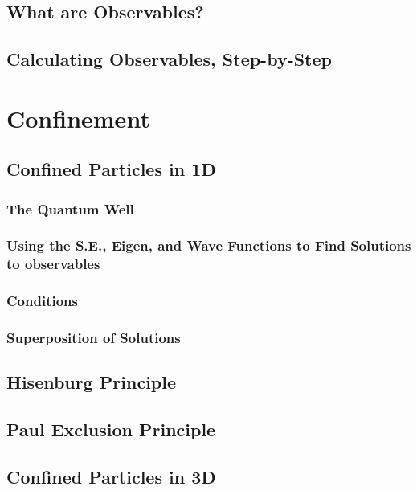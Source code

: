 \documentclass[colorlinks,11pt,a4paper,normalphoto,withhyper,ragged2e]{altareport}
\begin{document}
	\subsection{What are Observables?}
	
	
	\subsection{Calculating Observables, Step-by-Step}
	
	
	\pagebreak
	
	
	
	
\section{Confinement}
	
	\subsection{Confined Particles in 1D}
		
		\subsubsection{The Quantum Well}
		
		
		\subsubsection{Using the S.E., Eigen, and Wave Functions to Find Solutions to observables}
		
		
		\subsubsection{Conditions}
		
		
		\subsubsection{Superposition of Solutions}
		
		
	\subsection{Hisenburg Principle}
	
	
	\subsection{Paul Exclusion Principle}
	
	
	\subsection{Confined Particles in 3D}
	
\end{document}
